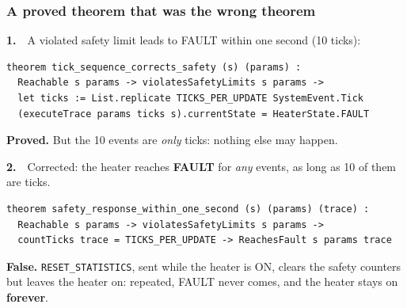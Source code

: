 \begin{frame}[fragile]
  \frametitle{A proved theorem that was the wrong theorem} \small
{}

\vspace{-0.3cm}
{\bf 1.}\ \ A violated safety limit leads to FAULT within one second (10 ticks):

\vspace{0.1cm}
\begin{lstlisting}[language=lean4]
theorem tick_sequence_corrects_safety (s) (params) :
  Reachable s params -> violatesSafetyLimits s params ->
  let ticks := List.replicate TICKS_PER_UPDATE SystemEvent.Tick
  (executeTrace params ticks s).currentState = HeaterState.FAULT
\end{lstlisting}

\vspace{-0.05cm}
{\bf Proved.} But the 10 events are {\em only} ticks: nothing else may happen.

\pause

\vspace{0.25cm}
%
\parbox{0.86\textwidth}{{\bf 2.}\ \ Corrected: the heater reaches {\bf FAULT} for {\em any} events, as long as
10 of them are ticks.}

\vspace{0.1cm}
\begin{lstlisting}[language=lean4]
theorem safety_response_within_one_second (s) (params) (trace) :
  Reachable s params -> violatesSafetyLimits s params ->
  countTicks trace = TICKS_PER_UPDATE -> ReachesFault s params trace
\end{lstlisting}

\pause
\vspace{-0.05cm}
{\bf False.} {\tt RESET\_STATISTICS}, sent while the heater is ON, clears the safety
counters but leaves the heater on: repeated, FAULT never comes, and the heater stays on
{\bf forever}.

\end{frame}

